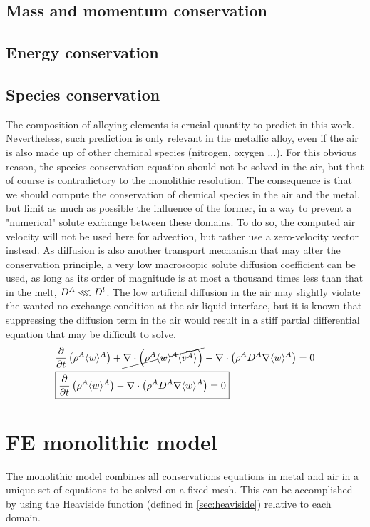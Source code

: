 \subsection{Mass and momentum conservation}

\subsection{Energy conservation}

\subsection{Species conservation}
%
The composition of alloying elements is crucial quantity to predict in this work. Nevertheless, such prediction is only relevant
in the metallic alloy, even if the air is also made up of other chemical species (nitrogen, oxygen ...). For this obvious reason,
the species conservation equation should not be solved in the air, but that of course is contradictory to the monolithic resolution.
The consequence is that we should compute the conservation of chemical species in the air and the metal, but limit as much as possible
the influence of the former, in a way to prevent a "numerical" solute exchange between these domains. To do so, the computed air velocity
will not be used here for advection, but rather use a zero-velocity vector instead. 
As diffusion is also another transport mechanism that may alter the conservation principle, a very low macroscopic solute diffusion 
coefficient can be used, as long as its order of magnitude is at most a thousand times less than that in the melt, $D^A \lll D^l$.
The low artificial diffusion in the air may slightly violate the wanted no-exchange condition at the air-liquid interface, but it is 
known that suppressing the diffusion term in the air would result in a stiff partial differential equation that may be difficult to solve.
\begin{align}
& \frac{\partial}{\partial t} \left( \rho^A \langle w \rangle^A \right)  + \cancel{\nabla \cdot \left( \rho^A \langle w \rangle^A \langle \vec{v^A} \rangle \right) } - \nabla \cdot\left( \rho^A D^A \nabla \langle w \rangle^A \right)  = 0 \\
\label{eq:solute_balance_air}
& \boxed{\frac{\partial}{\partial t} \left( \rho^A \langle w \rangle^A \right)  - \nabla \cdot\left( \rho^A D^A \nabla \langle w \rangle^A \right)  = 0}
\end{align}
%
%
\section{FE monolithic model}
The monolithic model combines all conservations equations in metal and air in a unique set of equations to be solved on a fixed mesh. 
This can be accomplished by using the Heaviside function (defined in \cref{sec:heaviside}) relative to each domain.
%
